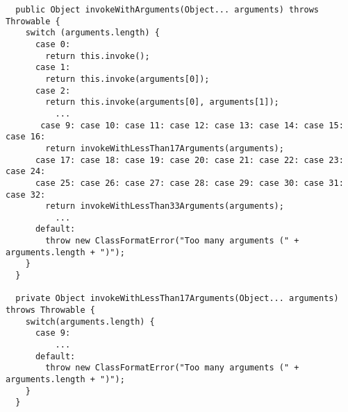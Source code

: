 {\tiny \begin{verbatim}
  public Object invokeWithArguments(Object... arguments) throws Throwable {
    switch (arguments.length) {
      case 0:
        return this.invoke();
      case 1:
        return this.invoke(arguments[0]);
      case 2:
        return this.invoke(arguments[0], arguments[1]);
          ...
       case 9: case 10: case 11: case 12: case 13: case 14: case 15: case 16:
        return invokeWithLessThan17Arguments(arguments);
      case 17: case 18: case 19: case 20: case 21: case 22: case 23: case 24:
      case 25: case 26: case 27: case 28: case 29: case 30: case 31: case 32:
        return invokeWithLessThan33Arguments(arguments);
          ...
      default:
        throw new ClassFormatError("Too many arguments (" + arguments.length + ")");
    }
  }

  private Object invokeWithLessThan17Arguments(Object... arguments) throws Throwable {
    switch(arguments.length) {
      case 9:
          ...
      default:
        throw new ClassFormatError("Too many arguments (" + arguments.length + ")");
    }
  }
\end{verbatim} }
